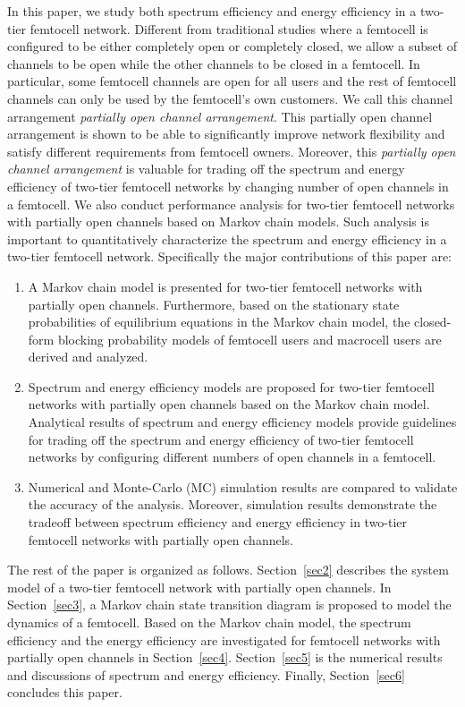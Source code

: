 \documentclass[10pt,final,journal,letterpaper,twoside,twocolumn]{IEEEtran}
\begin{document}
In this paper, we study both spectrum efficiency and energy efficiency in
a two-tier femtocell network. Different from traditional studies where a femtocell is configured to be either completely open or completely
closed, we allow a subset of channels to be open while the other channels to be closed in a femtocell. In particular, some femtocell channels are open for all users and the rest of femtocell
channels can only be used by the femtocell's own customers. We call this channel arrangement \textit{partially open channel arrangement}. This partially open channel arrangement is shown to be able to
significantly improve network flexibility and satisfy different requirements from femtocell owners. Moreover, this \textit{partially open channel arrangement} is valuable for trading off the spectrum and energy efficiency of two-tier femtocell networks by changing number of open channels in a femtocell. We also conduct performance analysis for two-tier femtocell networks with partially open channels based on Markov chain models.
Such analysis is important to quantitatively characterize the spectrum and energy
efficiency in a two-tier femtocell network. Specifically the major contributions of this paper
are:

\begin{enumerate}
\item A Markov chain model is presented for two-tier femtocell networks with partially
open channels. Furthermore, based on the stationary state probabilities of equilibrium equations in the Markov chain model, the closed-form blocking probability models of femtocell users and macrocell users are derived and analyzed.
\item Spectrum and energy efficiency models are proposed for two-tier femtocell networks with partially open channels based on the Markov chain model. Analytical results of spectrum and energy efficiency models provide guidelines for trading off the spectrum and energy efficiency of two-tier femtocell networks by configuring different numbers of open channels in a femtocell.
\item Numerical and Monte-Carlo (MC) simulation results are compared to validate the accuracy of the analysis. Moreover, simulation results demonstrate the tradeoff between spectrum efficiency and energy efficiency in two-tier femtocell networks with partially open channels.
\end{enumerate}

The rest of the paper is organized as follows. Section~\ref{sec2} describes the system model of a
two-tier femtocell network with partially open channels. In Section~\ref{sec3}, a
Markov chain state transition diagram is proposed to model the
dynamics of a femtocell. Based on the Markov chain model, the spectrum efficiency and the energy efficiency are investigated for femtocell networks with partially
open channels in Section~\ref{sec4}. Section~\ref{sec5} is the numerical results and discussions of spectrum and energy efficiency. Finally, Section~\ref{sec6} concludes this paper.
\end{document}
